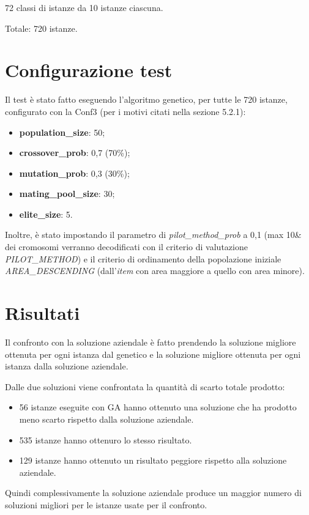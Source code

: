 72 classi di istanze da 10 istanze ciascuna.

Totale: 720 istanze.

\section{Configurazione test}

Il test è stato fatto eseguendo l'algoritmo genetico, per tutte le 720 istanze, configurato con la Conf3 (per i motivi citati nella sezione 5.2.1):
\begin{itemize}
    \item\textbf{population\_size}: 50;
	\item\textbf{crossover\_prob}: 0,7 (70\%);
	\item\textbf{mutation\_prob}: 0,3 (30\%);
	\item\textbf{mating\_pool\_size}: 30;
	\item\textbf{elite\_size}: 5.
\end{itemize}
Inoltre, è stato impostando il parametro di \emph{pilot\_method\_prob} a 0,1 (max 10\& dei cromosomi verranno decodificati con il criterio di valutazione \emph{PILOT\_METHOD}) e il criterio di ordinamento della popolazione iniziale \emph{AREA\_DESCENDING} (dall'\emph{item} con area maggiore a quello con area minore).

\section{Risultati}

Il confronto con la soluzione aziendale è fatto prendendo la soluzione migliore ottenuta per ogni istanza dal genetico e la soluzione migliore ottenuta per ogni istanza dalla soluzione aziendale.

Dalle due soluzioni viene confrontata la quantità di scarto totale prodotto:
\begin{itemize}
    \item 56 istanze eseguite con GA hanno ottenuto una soluzione che ha prodotto meno scarto rispetto dalla soluzione aziendale.
    \item 535 istanze hanno ottenuro lo stesso risultato.
    \item 129 istanze hanno ottenuto un risultato peggiore rispetto alla soluzione aziendale.
\end{itemize}

Quindi complessivamente la soluzione aziendale produce un maggior numero di soluzioni migliori per le istanze usate per il confronto.

